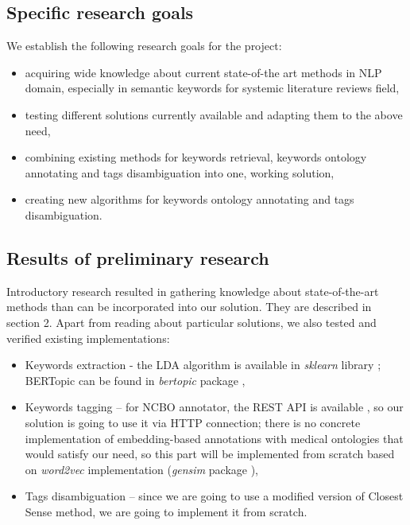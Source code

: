\documentclass[11pt]{article}
\begin{document}
\subsection{Specific research goals}

We establish the following research goals for the project:
\begin{itemize}
    \item acquiring wide knowledge about current state-of-the art methods in NLP domain, especially in semantic keywords for systemic literature reviews field,
    \item testing different solutions currently available and adapting them to the above need,
    \item combining existing methods for keywords retrieval, keywords ontology annotating and tags disambiguation into one, working solution,
    \item creating new algorithms for keywords ontology annotating and tags disambiguation.
\end{itemize}

\subsection{Results of preliminary research}

Introductory research resulted in gathering knowledge about state-of-the-art methods than can be incorporated into our solution. They are described in section 2.
Apart from reading about particular solutions, we also tested and verified existing implementations:
\begin{itemize}
	\item Keywords extraction - the LDA algorithm is available in \textit{sklearn} library \cite{sklearn_lda}; BERTopic can be found in \textit{bertopic} package \cite{pypi_bertopic},

	\item Keywords tagging – for NCBO annotator, the REST API is available \cite{ncbo_rest}, so our solution is going to use it via HTTP connection; there is no concrete implementation of embedding-based annotations with medical ontologies that would satisfy our need, so this part will be implemented from scratch based on \textit{word2vec} implementation (\textit{gensim} package \cite{pypi_genism}),

	\item Tags disambiguation – since we are going to use a modified version of Closest Sense method, we are going to implement it from scratch.

\end{itemize}
\end{document}
